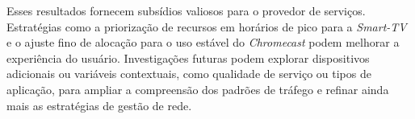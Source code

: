 Esses resultados fornecem subsídios valiosos para o provedor de serviços. Estratégias como a priorização de recursos em horários de pico para a \textit{Smart-TV} e o ajuste fino de alocação para o uso estável do \textit{Chromecast} podem melhorar a experiência do usuário. Investigações futuras podem explorar dispositivos adicionais ou variáveis contextuais, como qualidade de serviço ou tipos de aplicação, para ampliar a compreensão dos padrões de tráfego e refinar ainda mais as estratégias de gestão de rede.


